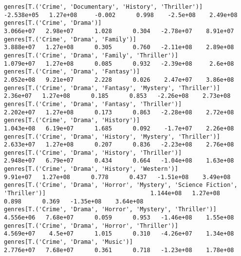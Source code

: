 \documentclass[11pt]{article}
\begin{document}
\begin{Verbatim}[commandchars=\\\{\}]
genres[T.('Crime', 'Documentary', 'History', 'Thriller')]                                                    -2.538e+05   1.27e+08     -0.002      0.998    -2.5e+08    2.49e+08
genres[T.('Crime', 'Drama')]                                                                                  3.066e+07   2.98e+07      1.028      0.304   -2.78e+07    8.91e+07
genres[T.('Crime', 'Drama', 'Family')]                                                                        3.888e+07   1.27e+08      0.305      0.760   -2.11e+08    2.89e+08
genres[T.('Crime', 'Drama', 'Family', 'Thriller')]                                                            1.079e+07   1.27e+08      0.085      0.932   -2.39e+08     2.6e+08
genres[T.('Crime', 'Drama', 'Fantasy')]                                                                       2.052e+08   9.21e+07      2.228      0.026    2.47e+07    3.86e+08
genres[T.('Crime', 'Drama', 'Fantasy', 'Mystery', 'Thriller')]                                                 2.36e+07   1.27e+08      0.185      0.853   -2.26e+08    2.73e+08
genres[T.('Crime', 'Drama', 'Fantasy', 'Thriller')]                                                           2.202e+07   1.27e+08      0.173      0.863   -2.28e+08    2.72e+08
genres[T.('Crime', 'Drama', 'History')]                                                                       1.043e+08   6.19e+07      1.685      0.092    -1.7e+07    2.26e+08
genres[T.('Crime', 'Drama', 'History', 'Mystery', 'Thriller')]                                                2.633e+07   1.27e+08      0.207      0.836   -2.23e+08    2.76e+08
genres[T.('Crime', 'Drama', 'History', 'Thriller')]                                                           2.948e+07   6.79e+07      0.434      0.664   -1.04e+08    1.63e+08
genres[T.('Crime', 'Drama', 'History', 'Western')]                                                             9.91e+07   1.27e+08      0.778      0.437   -1.51e+08    3.49e+08
genres[T.('Crime', 'Drama', 'Horror', 'Mystery', 'Science Fiction', 'Thriller')]                              1.144e+08   1.27e+08      0.898      0.369   -1.35e+08    3.64e+08
genres[T.('Crime', 'Drama', 'Horror', 'Mystery', 'Thriller')]                                                 4.556e+06   7.68e+07      0.059      0.953   -1.46e+08    1.55e+08
genres[T.('Crime', 'Drama', 'Horror', 'Thriller')]                                                            4.569e+07    4.5e+07      1.015      0.310   -4.26e+07    1.34e+08
genres[T.('Crime', 'Drama', 'Music')]                                                                         2.776e+07   7.68e+07      0.361      0.718   -1.23e+08    1.78e+08

\end{Verbatim}
\end{document}

